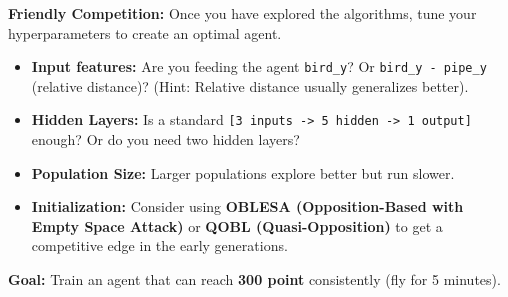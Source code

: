 \documentclass[
  12pt,
]{article}
\providecommand{\tightlist}{%
  \setlength{\itemsep}{0pt}\setlength{\parskip}{0pt}}
\begin{document}
\textbf{Friendly Competition:} Once you have explored the algorithms,
tune your hyperparameters to create an optimal agent.

\begin{itemize}
\tightlist
\item
  \textbf{Input features:} Are you feeding the agent \texttt{bird\_y}?
  Or \texttt{bird\_y\ -\ pipe\_y} (relative distance)? (Hint: Relative
  distance usually generalizes better).
\item
  \textbf{Hidden Layers:} Is a standard
  \texttt{{[}3\ inputs\ -\textgreater{}\ 5\ hidden\ -\textgreater{}\ 1\ output{]}}
  enough? Or do you need two hidden layers?
\item
  \textbf{Population Size:} Larger populations explore better but run
  slower.
\item
  \textbf{Initialization:} Consider using \textbf{OBLESA
  (Opposition-Based with Empty Space Attack)} or \textbf{QOBL
  (Quasi-Opposition)} to get a competitive edge in the early
  generations.
\end{itemize}

\textbf{Goal:} Train an agent that can reach \textbf{300 point}
consistently (fly for 5 minutes).
\end{document}
